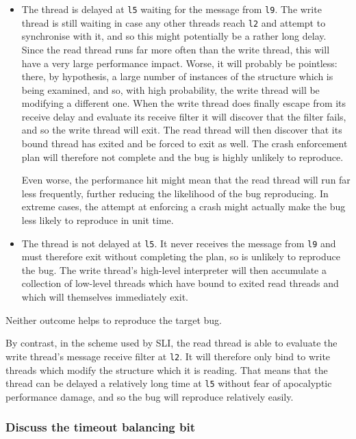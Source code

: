 \begin{itemize}
\item
  The thread is delayed at \verb|l5| waiting for the message from \verb|l9|.
  The write thread is still waiting in case any other threads reach \verb|l2| and attempt to synchronise with it, and so this might potentially be a rather long delay.
  Since the read thread runs far more often than the write thread, this will have a very large performance impact.
  Worse, it will probably be pointless: there, by hypothesis, a large number of instances of the structure which is being examined, and so, with high probability, the write thread will be modifying a different one.
  When the write thread does finally escape from its receive delay and evaluate its receive filter it will discover that the filter fails, and so the write thread will exit.
  The read thread will then discover that its bound thread has exited and be forced to exit as well.
  The crash enforcement plan will therefore not complete and the bug is highly unlikely to reproduce.
  
  Even worse, the performance hit might mean that the read thread will run far less frequently, further reducing the likelihood of the bug reproducing.
  In extreme cases, the attempt at enforcing a crash might actually make the bug less likely to reproduce in unit time.
\item
  The thread is not delayed at \verb|l5|.
  It never receives the message from \verb|l9| and must therefore exit without completing the plan, so is unlikely to reproduce the bug.
  The write thread's high-level interpreter will then accumulate a collection of low-level threads which have bound to exited read threads and which will themselves immediately exit.
\end{itemize}

Neither outcome helps to reproduce the target bug.

By contrast, in the scheme used by SLI, the read thread is able to evaluate the write thread's message receive filter at \verb|l2|.
It will therefore only bind to write threads which modify the structure which it is reading.
That means that the thread can be delayed a relatively long time at \verb|l5| without fear of apocalyptic performance damage, and so the bug will reproduce relatively easily.

\subsubsection{Discuss the timeout balancing bit}


